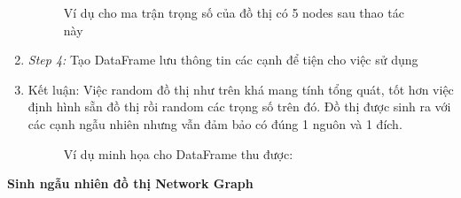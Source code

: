\documentclass[a4paper]{article}
\begin{document}
\begin{enumerate}
\begin{figure}[h]
        \caption{Ví dụ cho ma trận trọng số của đồ thị có 5 nodes sau thao tác này}
        \label{fig:enter-label}
    \end{figure}
    \item[] {\textit{Step 4:} Tạo DataFrame lưu thông tin các cạnh để tiện cho việc sử dụng } 
    \item[] {Kết luận: Việc random đồ thị như trên khá mang tính tổng quát, tốt hơn việc định hình sẵn đồ thị rồi random các trọng số trên đó. Đồ thị được sinh ra với các cạnh ngẫu nhiên nhưng vẫn đảm bảo có đúng 1 nguôn và 1 đích.} 
    \begin{figure}[h]
  \centering
  \hfill
  \caption{Ví dụ minh họa cho DataFrame thu được: }
\end{figure}
\end{enumerate}
\newpage
\textbf{Sinh ngẫu nhiên đồ thị Network Graph}
\end{document}
